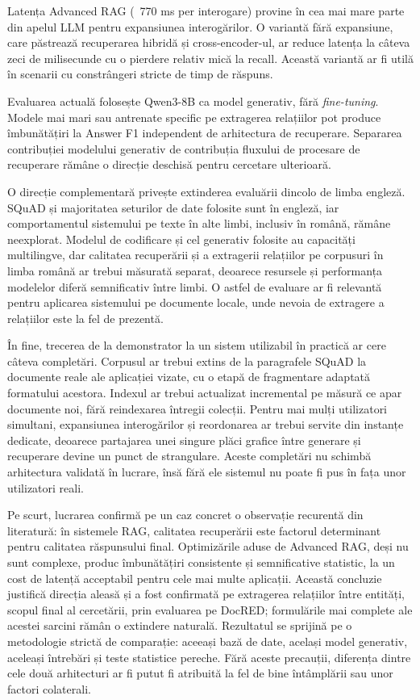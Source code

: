 Latența Advanced RAG (~770 ms per interogare) provine în cea mai mare parte din apelul LLM pentru expansiunea interogărilor. O variantă fără expansiune, care păstrează recuperarea hibridă și cross-encoder-ul, ar reduce latența la câteva zeci de milisecunde cu o pierdere relativ mică la recall. Această variantă ar fi utilă în scenarii cu constrângeri stricte de timp de răspuns.

Evaluarea actuală folosește Qwen3-8B ca model generativ, fără \textit{fine-tuning}. Modele mai mari sau antrenate specific pe extragerea relațiilor pot produce îmbunătățiri la Answer F1 independent de arhitectura de recuperare. Separarea contribuției modelului generativ de contribuția fluxului de procesare de recuperare rămâne o direcție deschisă pentru cercetare ulterioară.

O direcție complementară privește extinderea evaluării dincolo de limba engleză. SQuAD și majoritatea seturilor de date folosite sunt în engleză, iar comportamentul sistemului pe texte în alte limbi, inclusiv în română, rămâne neexplorat. Modelul de codificare și cel generativ folosite au capacități multilingve, dar calitatea recuperării și a extragerii relațiilor pe corpusuri în limba română ar trebui măsurată separat, deoarece resursele și performanța modelelor diferă semnificativ între limbi. O astfel de evaluare ar fi relevantă pentru aplicarea sistemului pe documente locale, unde nevoia de extragere a relațiilor este la fel de prezentă.

În fine, trecerea de la demonstrator la un sistem utilizabil în practică ar cere câteva completări. Corpusul ar trebui extins de la paragrafele SQuAD la documente reale ale aplicației vizate, cu o etapă de fragmentare adaptată formatului acestora. Indexul ar trebui actualizat incremental pe măsură ce apar documente noi, fără reindexarea întregii colecții. Pentru mai mulți utilizatori simultani, expansiunea interogărilor și reordonarea ar trebui servite din instanțe dedicate, deoarece partajarea unei singure plăci grafice între generare și recuperare devine un punct de strangulare. Aceste completări nu schimbă arhitectura validată în lucrare, însă fără ele sistemul nu poate fi pus în fața unor utilizatori reali.

Pe scurt, lucrarea confirmă pe un caz concret o observație recurentă din literatură: în sistemele RAG, calitatea recuperării este factorul determinant pentru calitatea răspunsului final. Optimizările aduse de Advanced RAG, deși nu sunt complexe, produc îmbunătățiri consistente și semnificative statistic, la un cost de latență acceptabil pentru cele mai multe aplicații. Această concluzie justifică direcția aleasă și a fost confirmată pe extragerea relațiilor între entități, scopul final al cercetării, prin evaluarea pe DocRED; formulările mai complete ale acestei sarcini rămân o extindere naturală. Rezultatul se sprijină pe o metodologie strictă de comparație: aceeași bază de date, același model generativ, aceleași întrebări și teste statistice pereche. Fără aceste precauții, diferența dintre cele două arhitecturi ar fi putut fi atribuită la fel de bine întâmplării sau unor factori colaterali.
